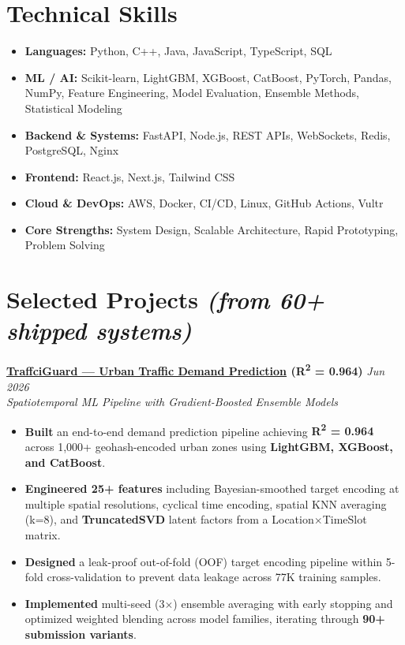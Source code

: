 \documentclass[a4paper,10pt]{article}
\begin{document}
\section{Technical Skills}
\begin{itemize}
    \item \textbf{Languages:} Python, C++, Java, JavaScript, TypeScript, SQL
    \item \textbf{ML / AI:} Scikit-learn, LightGBM, XGBoost, CatBoost, PyTorch, Pandas, NumPy, Feature Engineering, Model Evaluation, Ensemble Methods, Statistical Modeling
    \item \textbf{Backend \& Systems:} FastAPI, Node.js, REST APIs, WebSockets, Redis, PostgreSQL, Nginx
    \item \textbf{Frontend:} React.js, Next.js, Tailwind CSS
    \item \textbf{Cloud \& DevOps:} AWS, Docker, CI/CD, Linux, GitHub Actions, Vultr
    \item \textbf{Core Strengths:} System Design, Scalable Architecture, Rapid Prototyping, Problem Solving
\end{itemize}

\section{Selected Projects \textnormal{\textit{(from 60+ shipped systems)}}}

\textbf{\href{https://github.com/let-the-dreamers-rise/traffciguard}{TraffciGuard --- Urban Traffic Demand Prediction} \textnormal{(R\textsuperscript{2} = 0.964)}} \hfill \textit{Jun 2026} \\
\textit{Spatiotemporal ML Pipeline with Gradient-Boosted Ensemble Models}
\begin{itemize}
    \item \textbf{Built} an end-to-end demand prediction pipeline achieving \textbf{R\textsuperscript{2} = 0.964} across 1,000+ geohash-encoded urban zones using \textbf{LightGBM, XGBoost, and CatBoost}.
    \item \textbf{Engineered 25+ features} including Bayesian-smoothed target encoding at multiple spatial resolutions, cyclical time encoding, spatial KNN averaging (k=8), and \textbf{TruncatedSVD} latent factors from a Location$\times$TimeSlot matrix.
    \item \textbf{Designed} a leak-proof out-of-fold (OOF) target encoding pipeline within 5-fold cross-validation to prevent data leakage across 77K training samples.
    \item \textbf{Implemented} multi-seed (3$\times$) ensemble averaging with early stopping and optimized weighted blending across model families, iterating through \textbf{90+ submission variants}.
\end{itemize}
\end{document}
